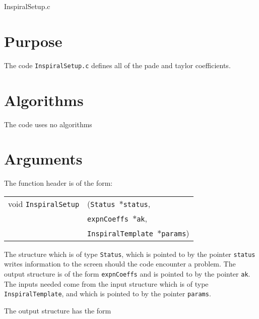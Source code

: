 \documentclass[12pt]{article}
\begin{document}
\huge
\begin{center}
InspiralSetup.c
\end{center}
\normalsize
\vspace{10mm}

\section{Purpose}

The code \texttt{InspiralSetup.c} defines all of the pade and taylor coefficients. 

\section{Algorithms}

The code uses no algorithms


\section{Arguments}

The function header is of the form:

\vspace{5mm}

\begin{tabular}{ll}
void \texttt{InspiralSetup}&(\texttt{Status $\ast$status},     \\
                                   &\texttt{expnCoeffs $\ast$ak}, \\
                                   &\texttt{InspiralTemplate $\ast$params})
\end{tabular}

\vspace{5mm}

The structure which is of type \texttt{Status}, which is pointed to by the pointer \texttt{status} writes information to the screen should the code encounter
a problem. The output structure is of the form \texttt{expnCoeffs} and is pointed to by the pointer \texttt{ak}.
The inputs needed come from the input structure which is of type \texttt{InspiralTemplate}, and which is pointed to by the pointer \texttt{params}.

The output structure has the form

\vspace{5mm}
\end{document}
